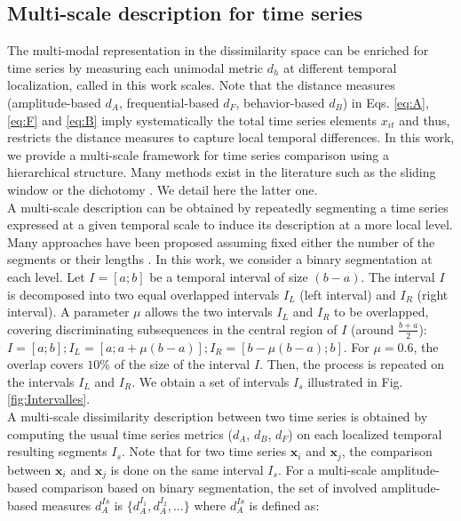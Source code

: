 \subsection{Multi-scale description for time series}
The multi-modal representation in the dissimilarity space can be enriched for time series by measuring each unimodal metric $d_h$ at different temporal localization, called in this work scales. Note that the distance measures (amplitude-based $d_A$, frequential-based $d_F$, behavior-based $d_B$) in Eqs. \ref{eq:A}, \ref{eq:F} and \ref{eq:B} imply systematically the total time series elements $x_{it}$ and thus, restricts the distance measures to capture local temporal differences. In this work, we provide a multi-scale framework for time series comparison using a hierarchical structure. Many methods exist in the literature such as the sliding window \cite{Keogh2003a} or the dichotomy \cite{AhlameDouzal-Chouakria2012}. We detail here the latter one. \\
\indent A multi-scale description can be obtained by repeatedly segmenting a time series expressed at a given temporal scale to induce its description at a more local level. Many approaches have been proposed assuming fixed either the number of the segments or their lengths \cite{Fu2011b}. In this work, we consider a binary segmentation at each level. Let $I=[a;b]$ be a temporal interval of size $(b-a)$. The interval $I$ is decomposed into two equal overlapped intervals $I_L$ (left interval) and $I_R$ (right interval). A parameter $\mu$ allows the two intervals $I_L$ and $I_R$ to be overlapped, covering discriminating subsequences in the central region of $I$ (around $\frac{b+a}{2}$): $I = [a;b]; I_L = [a;a+\mu(b-a)]; I_R = [b-\mu(b-a);b]$. 
\noindent For $\mu = 0.6$, the overlap covers $10\%$ of the size of the interval $I$. Then, the process is repeated on the intervals $I_L$ and $I_R$. We obtain a set of intervals $I_s$ illustrated in Fig. \ref{fig:Intervalles}. \\
A multi-scale dissimilarity description between two time series is obtained by computing the usual time series metrics ($d_A$, $d_B$, $d_F$) on each localized temporal resulting segments $I_s$. Note that for two time series $\textbf{x}_i$ and $\textbf{x}_j$, the comparison between $\textbf{x}_i$ and $\textbf{x}_j$ is done on the same interval $I_s$. For a multi-scale amplitude-based comparison based on binary segmentation, the set of involved amplitude-based measures $d^{Is}_A$ is $\{d^{I_1}_A, d^{I_2}_A, \ldots \}$ where $d^{Is}_A$ is defined as:
